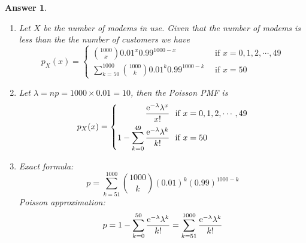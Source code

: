\documentclass[utf8]{article}
\theoremstyle{definition}%
\theoremstyle{plain}%
\newtheorem{answer}{Answer} %
\begin{document}
\begin{answer} ~
    \begin{enumerate}[label=(\alph*)]
        \item Let $X$ be the number of modems in use. Given that the number of modems is less than the the number of customers we have
        \begin{equation}
            p_X(x) = \left\{
            \begin{aligned}
                \binom{1000}{x} 0.01^x 0.99^{1000 - x}~~& \text{if } x = 0,1,2,\cdots,49 \\
                \sum_{k=50}^{1000} \binom{1000}{k} 0.01^k 0.99^{1000 - k}~~& \text{if } x = 50
            \end{aligned}\right.
        \end{equation}
        \item Let $\lambda = np = 1000 \times 0.01 = 10$, then the Poisson PMF is
        \begin{equation}
            p_X(x) = \left\{
            \begin{aligned}
                \frac{\mathrm{e}^{-\lambda} \lambda^x}{x!}~~& \text{if } x = 0,1,2,\cdots,49 \\
                1 - \sum_{k=0}^{49} \frac{\mathrm{e}^{-\lambda} \lambda^k}{k!}~~& \text{if } x = 50
            \end{aligned}\right.
        \end{equation}
        \item Exact formula:
        \begin{equation}
            p = \sum_{k=51}^{1000} \binom{1000}{k} (0.01)^k (0.99)^{1000 - k}
        \end{equation}
        Poisson approximation:
        \begin{equation}
            p = 1 - \sum_{k=0}^{50} \frac{\mathrm{e}^{-\lambda} \lambda^k}{k!} = \sum_{k=51}^{1000} \frac{\mathrm{e}^{-\lambda} \lambda^k}{k!}
        \end{equation}
    \end{enumerate}
\end{answer}
\end{document}
